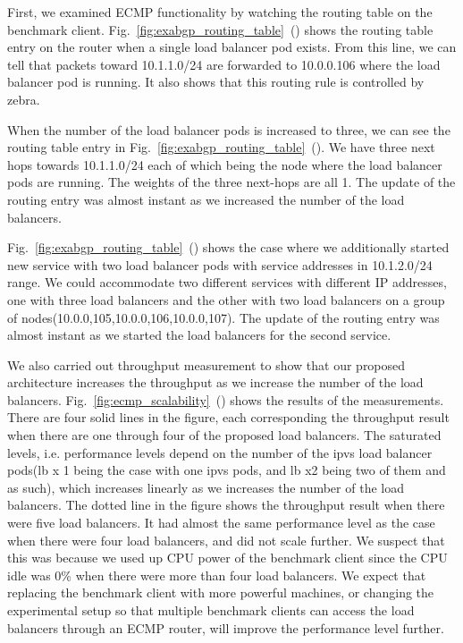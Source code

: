 First, we examined ECMP functionality by watching the routing table on the benchmark client.
Fig.~\ref{fig:exabgp_routing_table}~() shows the routing table entry on the router when a single load balancer pod exists.
From this line, we can tell that packets toward 10.1.1.0/24 are forwarded to 10.0.0.106 where the load balancer pod is running.
It also shows that this routing rule is controlled by zebra.

When the number of the load balancer pods is increased to three, we can see the routing table entry in Fig.~\ref{fig:exabgp_routing_table}~().
We have three next hops towards 10.1.1.0/24 each of which being the node where the load balancer pods are running.
The weights of the three next-hops are all 1.
The update of the routing entry was almost instant as we increased the number of the load balancers.

Fig.~\ref{fig:exabgp_routing_table}~() shows the case where we additionally started new service with two load balancer pods with service addresses in 10.1.2.0/24 range.
We could accommodate two different services with different IP addresses, one with three load balancers and the other with two load balancers on a group of nodes(10.0.0,105,10.0.0,106,10.0.0,107).
The update of the routing entry was almost instant as we started the load balancers for the second service.

We also carried out throughput measurement to show that our proposed architecture increases the throughput as we increase the number of the load balancers.
Fig.~\ref{fig:ecmp_scalability}~() shows the results of the measurements.
There are four solid lines in the figure, each corresponding the throughput result when there are one through four of the proposed load balancers.
The saturated levels, i.e. performance levels depend on the number of the ipvs load balancer pods(lb x 1 being the case with one ipvs pods, and lb x2 being two of them and as such), which increases linearly as we increases the number of the load balancers.
The dotted line in the figure shows the throughput result when there were five load balancers.
It had almost the same performance level as the case when there were four load balancers, and did not scale further.
We suspect that this was because we used up CPU power of the benchmark client since the CPU idle was 0\% when there were more than four load balancers.
We expect that replacing the benchmark client with more powerful machines, or changing the experimental setup so that multiple benchmark clients can access the load balancers through an ECMP router, will improve the performance level further.

